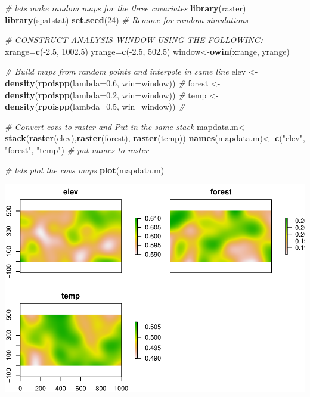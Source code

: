 \documentclass[]{book}
\newenvironment{Shaded}{\begin{snugshade}}{\end{snugshade}}
\newcommand{\KeywordTok}[1]{\textcolor[rgb]{0.13,0.29,0.53}{\textbf{{#1}}}}
\newcommand{\DataTypeTok}[1]{\textcolor[rgb]{0.13,0.29,0.53}{{#1}}}
\newcommand{\DecValTok}[1]{\textcolor[rgb]{0.00,0.00,0.81}{{#1}}}
\newcommand{\FloatTok}[1]{\textcolor[rgb]{0.00,0.00,0.81}{{#1}}}
\newcommand{\StringTok}[1]{\textcolor[rgb]{0.31,0.60,0.02}{{#1}}}
\newcommand{\CommentTok}[1]{\textcolor[rgb]{0.56,0.35,0.01}{\textit{{#1}}}}
\newcommand{\NormalTok}[1]{{#1}}
\begin{document}
\begin{Shaded}
\begin{Highlighting}[]
\CommentTok{# lets make random maps for the three covariates}
\KeywordTok{library}\NormalTok{(raster)}
\KeywordTok{library}\NormalTok{(spatstat)}
\KeywordTok{set.seed}\NormalTok{(}\DecValTok{24}\NormalTok{) }\CommentTok{# Remove for random simulations}

\CommentTok{# CONSTRUCT ANALYSIS WINDOW USING THE FOLLOWING:}
\NormalTok{xrange=}\KeywordTok{c}\NormalTok{(-}\FloatTok{2.5}\NormalTok{, }\FloatTok{1002.5}\NormalTok{)}
\NormalTok{yrange=}\KeywordTok{c}\NormalTok{(-}\FloatTok{2.5}\NormalTok{, }\FloatTok{502.5}\NormalTok{)}
\NormalTok{window<-}\KeywordTok{owin}\NormalTok{(xrange, yrange)}

\CommentTok{# Build maps from random points and interpole in same line}
\NormalTok{elev   <-}\StringTok{ }\KeywordTok{density}\NormalTok{(}\KeywordTok{rpoispp}\NormalTok{(}\DataTypeTok{lambda=}\FloatTok{0.6}\NormalTok{, }\DataTypeTok{win=}\NormalTok{window)) }\CommentTok{# }
\NormalTok{forest <-}\StringTok{ }\KeywordTok{density}\NormalTok{(}\KeywordTok{rpoispp}\NormalTok{(}\DataTypeTok{lambda=}\FloatTok{0.2}\NormalTok{, }\DataTypeTok{win=}\NormalTok{window)) }\CommentTok{# }
\NormalTok{temp   <-}\StringTok{ }\KeywordTok{density}\NormalTok{(}\KeywordTok{rpoispp}\NormalTok{(}\DataTypeTok{lambda=}\FloatTok{0.5}\NormalTok{, }\DataTypeTok{win=}\NormalTok{window)) }\CommentTok{# }

\CommentTok{# Convert covs to raster and Put in the same stack }
\NormalTok{mapdata.m<-}\KeywordTok{stack}\NormalTok{(}\KeywordTok{raster}\NormalTok{(elev),}\KeywordTok{raster}\NormalTok{(forest), }\KeywordTok{raster}\NormalTok{(temp)) }
\KeywordTok{names}\NormalTok{(mapdata.m)<-}\StringTok{ }\KeywordTok{c}\NormalTok{(}\StringTok{"elev"}\NormalTok{, }\StringTok{"forest"}\NormalTok{, }\StringTok{"temp"}\NormalTok{) }\CommentTok{# put names to raster}

\CommentTok{# lets plot the covs maps}
\KeywordTok{plot}\NormalTok{(mapdata.m)}
\end{Highlighting}
\end{Shaded}

\includegraphics{Simul-Machalilla-book_files/figure-latex/spatial1-1.pdf}
\end{document}
